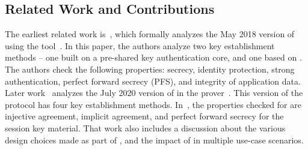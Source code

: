 \subsection{Related Work and Contributions}
\label{sub:related}
The earliest related work is~\cite{DBLP:conf/secsr/BruniJPS18}, which formally
analyzes the May 2018 version of \mEdhoc{} using the \mProverif{}
tool~\cite{DBLP:conf/csfw/Blanchet01}.
%
In this paper, the authors analyze two key establishment methods -- one built
on
a pre-shared key authentication core, and one based on \mSigma{}.
%
The authors check  the following properties: secrecy, identity protection, strong authentication, perfect forward secrecy
(PFS), and integrity of application data.
%
Later work~\cite{Norr21} analyzes the July 2020 version of \mEdhoc{} in the
\mTamarin{} prover~\cite{DBLP:conf/cav/MeierSCB13}.
%
This version of the protocol has four key establishment methods.
%
In~\cite{Norr21}, the properties checked for are injective agreement, implicit
agreement, and perfect forward secrecy for the session key material.
%
That work also includes a discussion about the various design choices made as
part of \mEdhoc{}, and the impact of \mEdhoc{} in multiple use-case scenarios.

